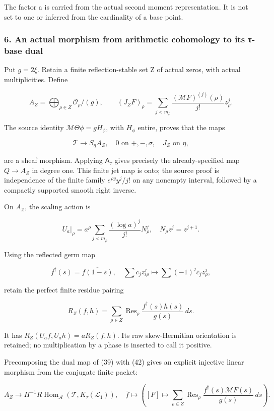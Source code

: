 The factor a is carried from the actual second moment representation. It is not set to one or inferred from the cardinality of a base point.

\subsubsection{6. An actual morphism from arithmetic cohomology to its τ-base dual}\label{endpoint-tau_base--an-actual-morphism-from-arithmetic-cohomology-to-its-ux3c4-base-dual}

Put \(g=2\xi\). Retain a finite reflection-stable set Z of actual zeros, with actual multiplicities. Define

\[
A_Z=\bigoplus_{\rho\in Z}\mathcal O_\rho/(g),
\qquad
(J_ZF)_\rho=\sum_{j<m_\rho}
\frac{(\mathcal MF)^{(j)}(\rho)}{j!}z_\rho^j.
\tag{38}
\]

The source identity \(\mathcal M\Theta\phi=gH_\phi\), with \(H_\phi\) entire, proves that the maps

\[
\mathcal T\longrightarrow S_\eta A_Z,
\quad 0\text{ on }+, -,\sigma,\quad J_Z\text{ on }\eta,
\tag{39}
\]

are a sheaf morphism. Applying \(\mathsf A_\tau\) gives precisely the already-specified map \(Q\to A_Z\) in degree one. This finite jet map is onto; the source proof is independence of the finite family \(e^{\rho y}y^j/j!\) on any nonempty interval, followed by a compactly supported smooth right inverse.

On \(A_Z\), the scaling action is

\[
U_a|_\rho=a^\rho\sum_{j<m_\rho}\frac{(\log a)^j}{j!}N_\rho^j,
\quad N_\rho z^j=z^{j+1}.
\tag{40}
\]

Using the reflected germ map

\[
f^\dagger(s)=\overline{f(1-\bar s)},
\quad
\sum c_jz_{\iota\rho}^j\mapsto\sum(-1)^j\bar c_jz_\rho^j,
\tag{41}
\]

retain the perfect finite residue pairing

\[
R_Z(f,h)=\sum_{\rho\in Z}\operatorname{Res}_\rho
\frac{f^\dagger(s)h(s)}{g(s)}\,ds.
\tag{42}
\]

It has \(R_Z(U_af,U_ah)=aR_Z(f,h)\). Its raw skew-Hermitian orientation is retained; no multiplication by a phase is inserted to call it positive.

Precomposing the dual map of (39) with (42) gives an explicit injective linear morphism from the conjugate finite packet:

\[
\boxed{
\overline{A_Z}\longrightarrow
H^{-1}R\operatorname{Hom}_{\mathcal A}(\mathcal T,K_\tau(\mathcal L_1)),
\quad
\bar f\longmapsto
\left([F]\longmapsto\sum_{\rho\in Z}\operatorname{Res}_\rho
\frac{f^\dagger(s)\mathcal MF(s)}{g(s)}\,ds\right).
}
\tag{43}
\]

